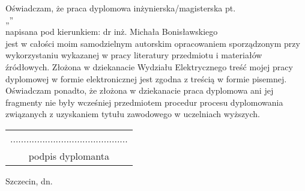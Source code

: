 \thispagestyle{empty}


Oświadczam, że praca dyplomowa inżynierska/magisterska pt. \\
 „\paperTitlePl” \\
napisana pod kierunkiem: dr inż. Michała Bonisławskiego \\
jest w całości moim samodzielnym autorskim opracowaniem sporządzonym przy wykorzystaniu wykazanej w pracy literatury przedmiotu i materiałów źródłowych.
Złożona w dziekanacie Wydziału Elektrycznego treść mojej pracy dyplomowej w formie elektronicznej jest zgodna z treścią w formie pisemnej. \\

Oświadczam ponadto, że złożona w dziekanacie praca dyplomowa ani jej fragmenty nie
były wcześniej przedmiotem procedur procesu dyplomowania związanych z uzyskaniem
tytułu zawodowego w uczelniach wyższych.
\vspace{30mm}


\begin{flushright}
	\begin{tabular}{c}
  		............................................\\
  		podpis dyplomanta
	\end{tabular}
\end{flushright}

\vspace{5mm}

\begin{flushleft}
	Szczecin, dn. \topicAcceptationDate
\end{flushleft}


\clearpage
